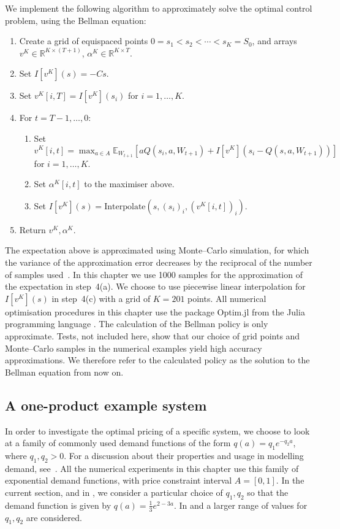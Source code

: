 \documentclass[main.tex]{subfiles}
\begin{document}
We implement the following algorithm to approximately solve the optimal control
problem, using the Bellman equation:
\begin{enumerate}
\item Create a grid of equispaced points $0=s_1<s_2<\cdots<s_K=S_0$, and arrays $v^K\in\mathbb{R}^{K\times(T+1)}$,
  $\alpha^K\in\mathbb{R}^{K\times T}$.
\item Set $I[v^K](s)=-Cs$.
\item Set $v^K[i,T]=I[v^K](s_i)$ for $i=1,\dots, K$.
\item For $t = T-1,\dots,0$:
  \begin{enumerate}
  \item Set $\displaystyle v^K[i,t]=\max_{a\in A}\mathbb{E}_{W_{t+1}}\left[ aQ(s_i,a,W_{t+1})
      +I[v^K](s_i-Q(s,a,W_{t+1}))\right]$\\ for $i=1,\dots,K$.
  \item Set $\alpha^K[i,t]$ to the maximiser above.
  \item Set $I[v^K](s) = \mathrm{Interpolate}(s, {(s_i)}_i,{(v^K[i,t])}_i)$.
  \end{enumerate}
\item Return $v^K,\alpha^K$.
\end{enumerate}
The expectation above is approximated using Monte--Carlo simulation,
for which the variance of the approximation error decreases by the
reciprocal of the
number of samples used~\citep{caflisch1998monte}.
In this chapter we use \num{1000} samples for the approximation of the
expectation in step~4(a).
We choose to use piecewise
linear interpolation for $I[v^K](s)$ in step~4(c) with a grid of
$K=201$ points. All numerical optimisation procedures in this chapter
use the package Optim.jl \citep{mogensen2018optim} from the Julia
programming language \citep{bezanson2017julia}.
The calculation of the Bellman policy is only
approximate. Tests, not included here, show that our choice of grid points and Monte--Carlo samples
in the numerical examples yield high accuracy approximations.
We therefore refer to the calculated policy as the solution to the
Bellman equation from now on.


\subsection{A one-product example system}\label{subsec:bellman_example_markdown}
In order to investigate the optimal pricing of a specific system, we
choose to look at a family of commonly used demand functions of the form
$q(a)=q_1e^{-q_2a}$, where $q_1,q_2>0$. For a discussion
about their properties and usage in modelling demand, see~\citet[Ch.~7]{talluri2006theory}.
All the numerical experiments in this chapter use this family of exponential
demand functions, with price constraint interval $A=[0,1]$.
In the current section, and in
,
we consider a particular choice of $q_1,q_2$ so that the demand
function is given by $q(a)=\frac{1}{3}e^{2-3a}$.
In  and  a larger
range of values for $q_1,q_2$ are considered.
\end{document}
